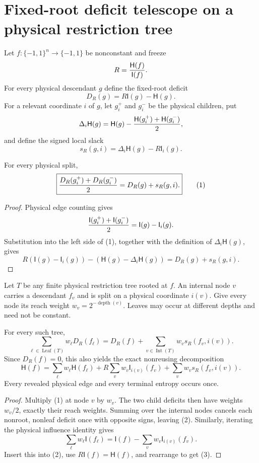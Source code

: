 \section*{Fixed-root deficit telescope on a physical restriction tree}

Let $f:\{-1,1\}^n\to\{-1,1\}$ be nonconstant and freeze
\[
 R={\mathsf H(f)\over\mathsf I(f)}.
\]
For every physical descendant $g$ define the fixed-root deficit
\[
 D_R(g)=R\mathsf I(g)-\mathsf H(g).
\]
For a relevant coordinate $i$ of $g$, let $g_i^+$ and $g_i^-$ be the
physical children, put
\[
 \Delta_i\mathsf H(g)=\mathsf H(g)
 -{\mathsf H(g_i^+)+\mathsf H(g_i^-)\over2},
\]
and define the signed local slack
\[
 s_R(g,i)=\Delta_i\mathsf H(g)-R\mathsf I_i(g).
\]

\begin{lemma}
For every physical split,
\[
 \boxed{
 {D_R(g_i^+)+D_R(g_i^-)\over2}=D_R(g)+s_R(g,i).}       \tag{1}
\]
\end{lemma}

\begin{proof}
Physical edge counting gives
\[
 {\mathsf I(g_i^+)+\mathsf I(g_i^-)\over2}
 =\mathsf I(g)-\mathsf I_i(g).
\]
Substitution into the left side of (1), together with the definition of
$\Delta_i\mathsf H(g)$, gives
\[
 R(\mathsf I(g)-\mathsf I_i(g))
 -(\mathsf H(g)-\Delta_i\mathsf H(g))
 =D_R(g)+s_R(g,i).
\]
\end{proof}

Let $T$ be any finite physical restriction tree rooted at $f$.  An internal
node $v$ carries a descendant $f_v$ and is split on a physical coordinate
$i(v)$.  Give every node its reach weight $w_v=2^{-\operatorname{depth}(v)}$.
Leaves may occur at different depths and need not be constant.

\begin{theorem}
For every such tree,
\[
 \boxed{
 \sum_{\ell\in\operatorname{Leaf}(T)}w_\ell D_R(f_\ell)
 =D_R(f)+
 \sum_{v\in\operatorname{Int}(T)}w_v s_R(f_v,i(v)).}    \tag{2}
\]
Since $D_R(f)=0$, this also yields the exact nonreusing decomposition
\[
 \boxed{
 \mathsf H(f)=
 \sum_\ell w_\ell\mathsf H(f_\ell)
 +R\sum_v w_v\mathsf I_{i(v)}(f_v)
 +\sum_v w_v s_R(f_v,i(v)).}                            \tag{3}
\]
Every revealed physical edge and every terminal entropy occurs once.
\end{theorem}

\begin{proof}
Multiply (1) at node $v$ by $w_v$.  The two child deficits then have weights
$w_v/2$, exactly their reach weights.  Summing over the internal nodes cancels
each nonroot, nonleaf deficit once with opposite signs, leaving (2).
Similarly, iterating the physical influence identity gives
\[
 \sum_\ell w_\ell\mathsf I(f_\ell)
 =\mathsf I(f)-\sum_vw_v\mathsf I_{i(v)}(f_v).
\]
Insert this into (2), use $R\mathsf I(f)=\mathsf H(f)$, and rearrange to get
(3).
\end{proof}

